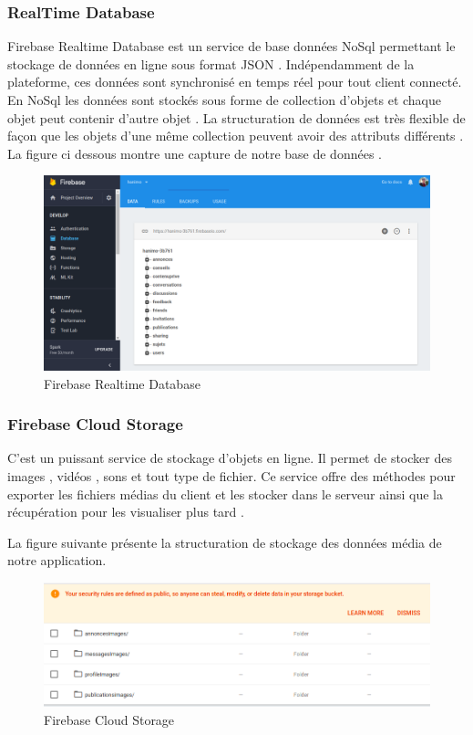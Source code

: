 \documentclass[11pt,a4paper,oneside]{book}
\begin{document}
					\subsubsection{RealTime Database}
					Firebase Realtime Database est un service de base données NoSql permettant le stockage de données en ligne sous format JSON . Indépendamment de la plateforme, ces données sont synchronisé en temps réel pour tout client connecté. En NoSql les données sont stockés sous forme de collection d’objets et chaque objet peut contenir d’autre objet . La structuration de données est très flexible de façon que les objets d’une même collection peuvent avoir des attributs différents .
					La figure ci dessous montre une capture de notre base de données .
					
\begin{figure}[H]
	\centering
	\includegraphics[width=1.3\linewidth]{Images/ch4/bd}
	\caption{Firebase Realtime Database}
	\label{fig:bd}
\end{figure}
					\subsubsection{Firebase Cloud Storage}
					
					C’est un puissant service de stockage d’objets en ligne. Il permet de stocker des images , vidéos , sons et tout type de fichier. 
					Ce service offre des méthodes pour exporter les fichiers médias du client et les stocker dans le serveur ainsi que la récupération pour les visualiser plus tard .
					
					La figure suivante présente la structuration de stockage des données média de notre application. 
					
					
					
\begin{figure}[H]
	\centering
	\includegraphics[width=1.3\linewidth]{Images/ch4/storage}
	\caption{Firebase Cloud Storage}
	\label{fig:storage}
\end{figure}
					
\end{document}
